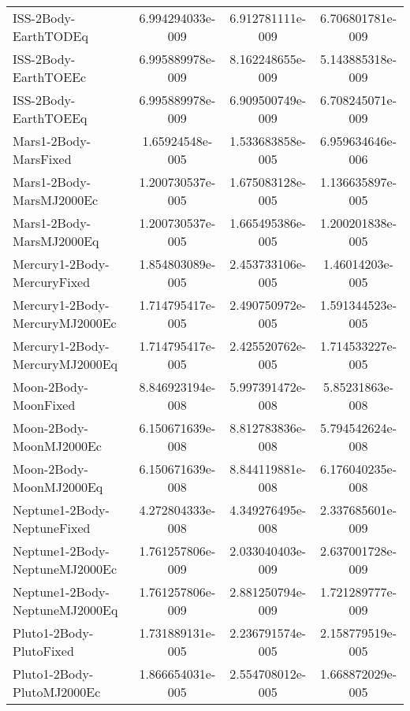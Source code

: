 \begin{table}[htbp!]
\begin{tabular}{lccc}
         ISS-2Body-EarthTODEq & 6.994294033e-009 & 6.912781111e-009 & 6.706801781e-009 \\
         ISS-2Body-EarthTOEEc & 6.995889978e-009 & 8.162248655e-009 & 5.143885318e-009 \\
         ISS-2Body-EarthTOEEq & 6.995889978e-009 & 6.909500749e-009 & 6.708245071e-009 \\
         Mars1-2Body-MarsFixed & 1.65924548e-005 & 1.533683858e-005 & 6.959634646e-006 \\
         Mars1-2Body-MarsMJ2000Ec & 1.200730537e-005 & 1.675083128e-005 & 1.136635897e-005 \\
         Mars1-2Body-MarsMJ2000Eq & 1.200730537e-005 & 1.665495386e-005 & 1.200201838e-005 \\
         Mercury1-2Body-MercuryFixed & 1.854803089e-005 & 2.453733106e-005 & 1.46014203e-005 \\
         Mercury1-2Body-MercuryMJ2000Ec & 1.714795417e-005 & 2.490750972e-005 & 1.591344523e-005 \\
         Mercury1-2Body-MercuryMJ2000Eq & 1.714795417e-005 & 2.425520762e-005 & 1.714533227e-005 \\
         Moon-2Body-MoonFixed & 8.846923194e-008 & 5.997391472e-008 & 5.85231863e-008 \\
         Moon-2Body-MoonMJ2000Ec & 6.150671639e-008 & 8.812783836e-008 & 5.794542624e-008 \\
         Moon-2Body-MoonMJ2000Eq & 6.150671639e-008 & 8.844119881e-008 & 6.176040235e-008 \\
         Neptune1-2Body-NeptuneFixed & 4.272804333e-008 & 4.349276495e-008 & 2.337685601e-009 \\
         Neptune1-2Body-NeptuneMJ2000Ec & 1.761257806e-009 & 2.033040403e-009 & 2.637001728e-009 \\
         Neptune1-2Body-NeptuneMJ2000Eq & 1.761257806e-009 & 2.881250794e-009 & 1.721289777e-009 \\
         Pluto1-2Body-PlutoFixed & 1.731889131e-005 & 2.236791574e-005 & 2.158779519e-005 \\
         Pluto1-2Body-PlutoMJ2000Ec & 1.866654031e-005 & 2.554708012e-005 & 1.668872029e-005 \\

\end{tabular}
\end{table}
